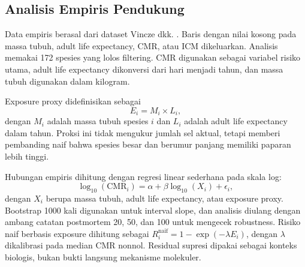 \subsection{Analisis Empiris Pendukung}

Data empiris berasal dari dataset Vincze dkk. \cite{vincze2022}. Baris dengan
nilai kosong pada massa tubuh, adult life expectancy, CMR, atau ICM dikeluarkan.
Analisis memakai 172 spesies yang lolos filtering. CMR digunakan sebagai
variabel risiko utama, adult life expectancy dikonversi dari hari menjadi
tahun, dan massa tubuh digunakan dalam kilogram.



Exposure proxy didefinisikan sebagai
\begin{equation}
    E_i = M_i \times L_i,
\end{equation}
dengan $M_i$ adalah massa tubuh spesies $i$ dan $L_i$ adalah adult life
expectancy dalam tahun. Proksi ini tidak mengukur jumlah sel aktual, tetapi
memberi pembanding naif bahwa spesies besar dan berumur panjang memiliki
paparan lebih tinggi.

Hubungan empiris dihitung dengan regresi linear sederhana pada skala log:
\begin{equation}
    \log_{10}(\mathrm{CMR}_i) =
    \alpha + \beta \log_{10}(X_i) + \epsilon_i,
\end{equation}
dengan $X_i$ berupa massa tubuh, adult life expectancy, atau exposure proxy.
Bootstrap 1000 kali digunakan untuk interval slope, dan analisis diulang dengan
ambang catatan postmortem 20, 50, dan 100 untuk mengecek robustness. Risiko
naif berbasis exposure dihitung sebagai $R_i^\mathrm{naif}=1-\exp(-\lambda E_i)$,
dengan $\lambda$ dikalibrasi pada median CMR nonnol. Residual supresi dipakai
sebagai konteks biologis, bukan bukti langsung mekanisme molekuler.
